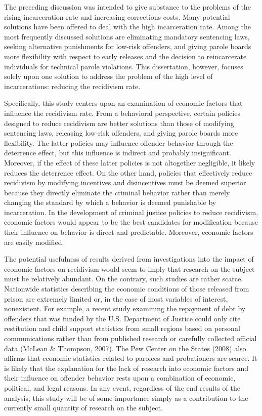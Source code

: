 The preceding discussion was intended to give substance to the problems of the rising incarceration rate and increasing corrections costs.  Many potential solutions have been offered to deal with the high incarceration rate.  Among the most frequently discussed solutions are eliminating mandatory sentencing laws, seeking alternative punishments for low-risk offenders, and giving parole boards more flexibility with respect to early releases and the decision to reincarcerate individuals for technical parole violations.  This dissertation, however, focuses solely upon one solution to address the problem of the high level of incarcerations:  reducing the recidivism rate.

Specifically, this study centers upon an examination of economic factors that influence the recidivism rate.  From a behavioral perspective, certain policies designed to reduce recidivism are better solutions than those of modifying sentencing laws, releasing low-risk offenders, and giving parole boards more flexibility.  The latter policies may influence offender behavior through the deterrence effect, but this influence is indirect and probably insignificant. Moreover, if the effect of these latter policies is not altogether negligible, it likely reduces the deterrence effect.  On the other hand, policies that effectively reduce recidivism by modifying incentives and disincentives must be deemed superior because they directly eliminate the criminal behavior rather than merely changing the standard by which a behavior is deemed punishable by incarceration.  In the development of criminal justice policies to reduce recidivism, economic factors would appear to be the best candidates for modification because their influence on behavior is direct and predictable.  Moreover, economic factors are easily modified.

The potential usefulness of results derived from investigations into the impact of economic factors on recidivism would seem to imply that research on the subject must be relatively abundant.  On the contrary, such studies are rather scarce.  Nationwide statistics describing the economic conditions of those released from prison are extremely limited or, in the case of most variables of interest, nonexistent.  For example, a recent study examining the repayment of debt by offenders that was funded by the U.S. Department of Justice could only cite restitution and child support statistics from small regions based on personal communications rather than from published research or carefully collected official data (McLean \& Thompson, 2007).  The Pew Center on the States (2008) also affirms that economic statistics related to parolees and probationers are scarce.  It is likely that the explanation for the lack of research into economic factors and their influence on offender behavior rests upon a combination of economic, political, and legal reasons.  In any event, regardless of the end results of the analysis, this study will be of some importance simply as a contribution to the currently small quantity of research on the subject.

